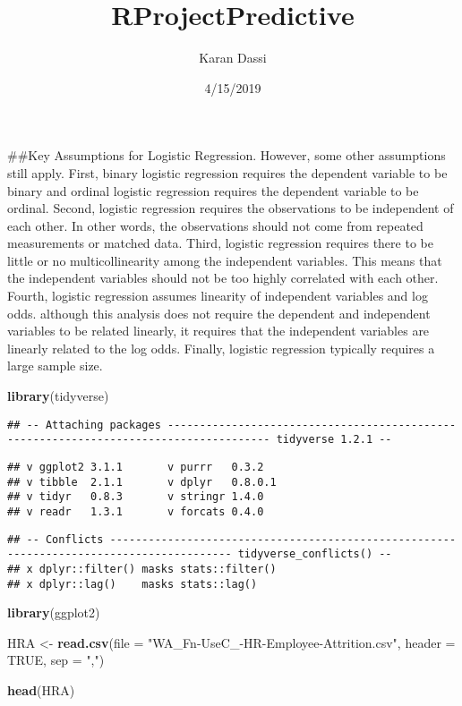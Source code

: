 \documentclass[]{article}
\title{RProjectPredictive}
\author{Karan Dassi}
\date{4/15/2019}
\newenvironment{Shaded}{\begin{snugshade}}{\end{snugshade}}
\newcommand{\DataTypeTok}[1]{\textcolor[rgb]{0.13,0.29,0.53}{#1}}
\newcommand{\KeywordTok}[1]{\textcolor[rgb]{0.13,0.29,0.53}{\textbf{#1}}}
\newcommand{\NormalTok}[1]{#1}
\newcommand{\OtherTok}[1]{\textcolor[rgb]{0.56,0.35,0.01}{#1}}
\newcommand{\StringTok}[1]{\textcolor[rgb]{0.31,0.60,0.02}{#1}}
\begin{document}
\maketitle

\#\#Key Assumptions for Logistic Regression. However, some other
assumptions still apply. First, binary logistic regression requires the
dependent variable to be binary and ordinal logistic regression requires
the dependent variable to be ordinal. Second, logistic regression
requires the observations to be independent of each other. In other
words, the observations should not come from repeated measurements or
matched data. Third, logistic regression requires there to be little or
no multicollinearity among the independent variables. This means that
the independent variables should not be too highly correlated with each
other. Fourth, logistic regression assumes linearity of independent
variables and log odds. although this analysis does not require the
dependent and independent variables to be related linearly, it requires
that the independent variables are linearly related to the log odds.
Finally, logistic regression typically requires a large sample size.

\begin{Shaded}
\begin{Highlighting}[]
\KeywordTok{library}\NormalTok{(tidyverse)}
\end{Highlighting}
\end{Shaded}

\begin{verbatim}
## -- Attaching packages -------------------------------------------------------------------------------------- tidyverse 1.2.1 --
\end{verbatim}

\begin{verbatim}
## v ggplot2 3.1.1       v purrr   0.3.2  
## v tibble  2.1.1       v dplyr   0.8.0.1
## v tidyr   0.8.3       v stringr 1.4.0  
## v readr   1.3.1       v forcats 0.4.0
\end{verbatim}

\begin{verbatim}
## -- Conflicts ----------------------------------------------------------------------------------------- tidyverse_conflicts() --
## x dplyr::filter() masks stats::filter()
## x dplyr::lag()    masks stats::lag()
\end{verbatim}

\begin{Shaded}
\begin{Highlighting}[]
\KeywordTok{library}\NormalTok{(ggplot2)}

\NormalTok{HRA <-}\StringTok{ }\KeywordTok{read.csv}\NormalTok{(}\DataTypeTok{file =} \StringTok{"WA_Fn-UseC_-HR-Employee-Attrition.csv"}\NormalTok{, }\DataTypeTok{header =} \OtherTok{TRUE}\NormalTok{, }\DataTypeTok{sep =} \StringTok{","}\NormalTok{)}

\KeywordTok{head}\NormalTok{(HRA)}
\end{Highlighting}
\end{Shaded}
\end{document}
